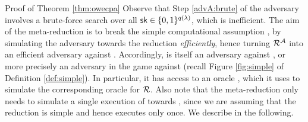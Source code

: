 \begin{namedproof}{Proof of Theorem \ref{thm:owecpa}}
  Observe that Step \ref{advA:brute} of the adversary \advA involves a brute-force search
  over all \(\mathsf{sk} \in \{0,1\}^{q(\lambda)}\), which is inefficient.
  The aim of the meta-reduction \redM is to break the simple computational assumption \Simple,
  by simulating the adversary \advA towards the reduction \redR \emph{efficiently},
  hence turning \(\redR^{\advA}\) into an efficient adversary against \Simple.
  Accordingly, \redM is itself an adversary against \Simple,
  or more precisely an adversary in the game \SICA against \Simple
  (recall Figure \ref{fig:simple} of Definition \ref{def:simple}).
  In particular, it has access to an oracle \oracle,
  which it uses to simulate the corresponding oracle for \(\redR\).
  Also note that the meta-reduction \redM only needs to simulate a single
  execution of \advA towards \redR,
  since we are assuming that the reduction \redR is simple
  and hence executes \advA only once.
  We describe \redM in the following.


\end{namedproof}

